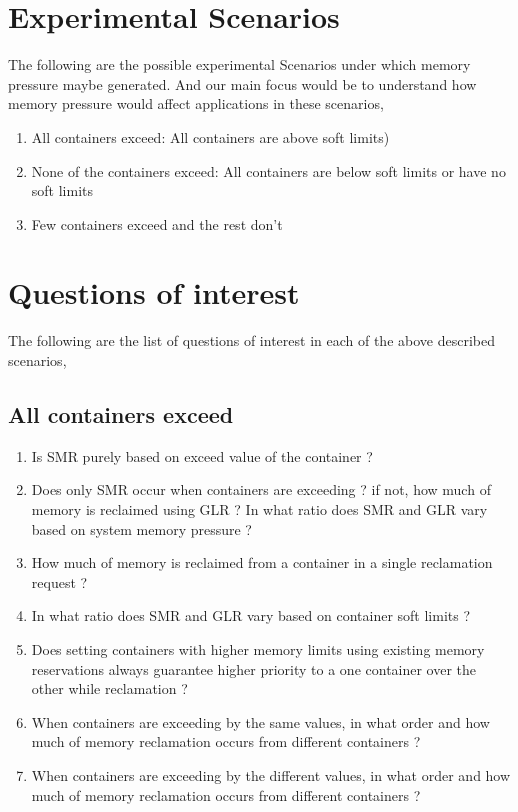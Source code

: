   \section{Experimental Scenarios}
    
    The following are the possible experimental Scenarios under which memory pressure maybe generated. And our main focus would be to 
understand how memory pressure would affect applications in these scenarios,

    \begin{enumerate}
      \item All containers exceed: All containers are above soft limits)
      \item None of the containers exceed: All containers are below soft limits or have no soft limits
      \item Few containers exceed and the rest don't
    \end{enumerate}
  
  \section{Questions of interest}
    \label{section_questions}
  
    The following are the list of questions of interest in each of the above described scenarios,
    
    \subsection{All containers exceed}
      
      \begin{enumerate}
	\item Is SMR purely based on exceed value of the container ?
	\item Does only SMR occur when containers are exceeding ? if not, how much of memory is reclaimed using GLR ?  In what ratio does 
SMR and GLR vary based on system memory pressure ?
	\item How much of memory is reclaimed from a container in a single reclamation request ?
	\item In what ratio does SMR and GLR vary based on container soft limits ?
	
	\item Does setting containers with higher memory limits using existing memory reservations always guarantee higher priority to a 
one container over the other while reclamation ?
	\item When containers are exceeding by the same values, in what order and how much of memory reclamation occurs from different 
containers ?
	\item When containers are exceeding by the different values, in what order and how much of memory reclamation occurs from different 
containers ?
      \end{enumerate}
  
